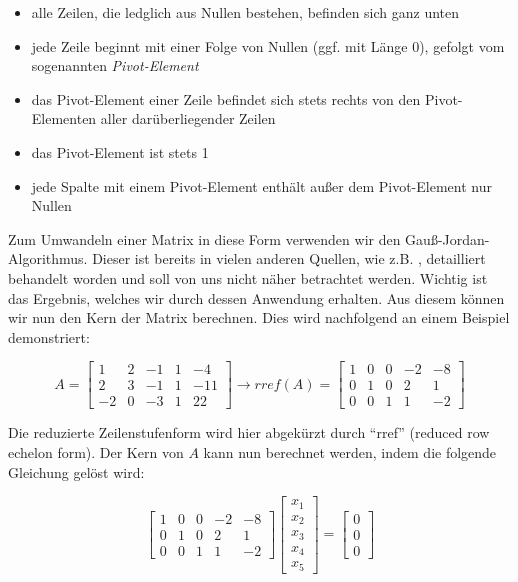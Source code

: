 \begin{itemize}
    \item alle Zeilen, die ledglich aus Nullen bestehen, befinden sich ganz unten
    \item jede Zeile beginnt mit einer Folge von Nullen (ggf. mit Länge 0), gefolgt vom sogenannten \textit{Pivot-Element}
    \item das Pivot-Element einer Zeile befindet sich stets rechts von den Pivot-Elementen aller darüberliegender Zeilen
    \item das Pivot-Element ist stets 1
    \item jede Spalte mit einem Pivot-Element enthält außer dem Pivot-Element nur Nullen
\end{itemize}

Zum Umwandeln einer Matrix in diese Form verwenden wir den Gauß-Jordan-Algorithmus. Dieser ist bereits in vielen anderen Quellen, wie z.B. \cite{47_meyer},
detailliert behandelt worden und soll von uns nicht näher betrachtet werden. Wichtig ist das Ergebnis, welches wir durch dessen Anwendung erhalten. Aus
diesem können wir nun den Kern der Matrix berechnen. Dies wird nachfolgend an einem Beispiel demonstriert:

\[
A =
\begin{bmatrix}
    1 & 2 & -1 & 1 & -4 \\
    2 & 3 & -1 & 1 & -11 \\
    -2 & 0 & -3 & 1 & 22 
\end{bmatrix}
\longrightarrow rref(A) =
\begin{bmatrix}
    1 & 0 & 0 & -2 & -8 \\
    0 & 1 & 0 & 2 & 1 \\
    0 & 0 & 1 & 1 & -2 
\end{bmatrix}
\]

Die reduzierte Zeilenstufenform wird hier abgekürzt durch ``rref'' (reduced row echelon form). Der Kern von \(A\) kann nun berechnet werden, indem die folgende
Gleichung gelöst wird:

\[
\begin{bmatrix}
    1 & 0 & 0 & -2 & -8 \\
    0 & 1 & 0 & 2 & 1 \\
    0 & 0 & 1 & 1 & -2 
\end{bmatrix}
\begin{bmatrix}
    x_1 \\ x_2 \\ x_3 \\ x_4 \\ x_5
\end{bmatrix}
=
\begin{bmatrix}
    0 \\ 0 \\ 0
\end{bmatrix}
\]

